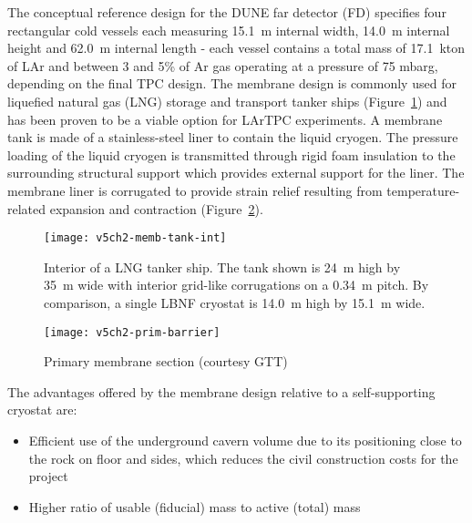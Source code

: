 
The conceptual reference design for the DUNE far detector (FD) %
 specifies four   %
rectangular cold vessels each measuring 15.1~m internal width, 14.0~m internal 
height and 62.0~m internal length - each vessel contains a total mass of 
17.1~kton of LAr and between 3 and 5\% of Ar gas operating at a 
pressure of 75 mbarg, depending on the final TPC design. The 
membrane design is commonly 
used for liquefied natural gas (LNG) storage and transport 
tanker ships (Figure~\ref{fig:memb-tank-int}) and has been 
proven to be a viable option for LArTPC experiments. 
A membrane tank 
is made of a stainless-steel liner to contain the liquid cryogen. 
The pressure loading of the liquid cryogen is transmitted 
through rigid foam insulation to the surrounding structural support 
which provides external support for the liner. The membrane 
liner is corrugated to provide strain relief resulting from 
temperature-related expansion and contraction (Figure~\ref{fig:prim-barrier}).

\begin{figure}[htbp]
\centering
\texttt{[image: v5ch2-memb-tank-int]}
\caption[Interior of a LNG tanker ship]{Interior of a LNG tanker ship. 
The tank shown is 24~m high by 35~m wide with interior grid-like 
corrugations on a 0.34~m pitch. By comparison, a single LBNF 
cryostat is %
14.0~m high by 15.1~m wide.}
\label{fig:memb-tank-int}
\end{figure}

\begin{figure}[htbp]
\centering
\texttt{[image: v5ch2-prim-barrier]}
\caption[Primary membrane section]{Primary membrane section (courtesy GTT)}
\label{fig:prim-barrier}
\end{figure}

The advantages offered by the membrane design relative to a self-supporting cryostat are:
\begin{itemize}
\item Efficient use of the underground cavern volume due to its positioning 
close to the rock on floor and sides, which reduces the civil construction 
costs for the project
\item Higher ratio of usable (fiducial) mass to active (total) mass
\end{itemize}

